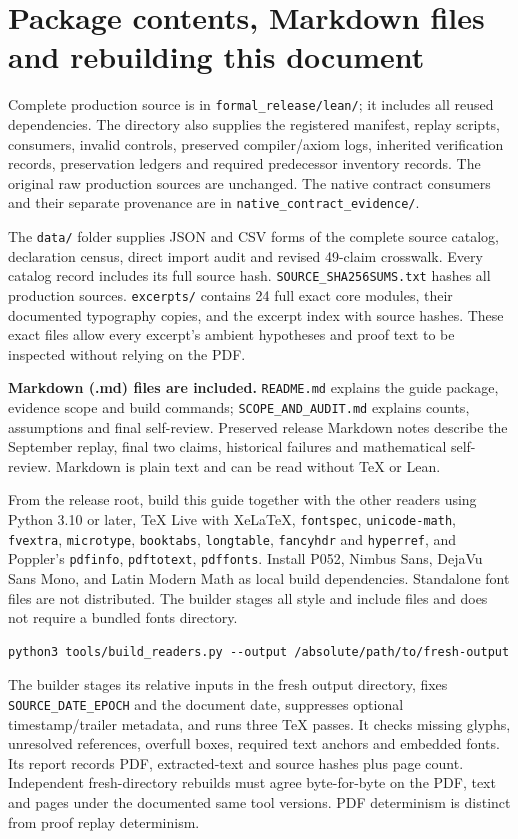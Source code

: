 \documentclass[11pt]{article}
\newcommand{\code}[1]{\nolinkurl{#1}}
\begin{document}
\section{Package contents, Markdown files and rebuilding this document}
Complete production source is in \code{formal_release/lean/}; it includes all reused dependencies. The directory also supplies the registered manifest, replay scripts, consumers, invalid controls, preserved compiler/axiom logs, inherited verification records, preservation ledgers and required predecessor inventory records. The original raw production sources are unchanged. The native contract consumers and their separate provenance are in \code{native_contract_evidence/}.

The \code{data/} folder supplies JSON and CSV forms of the complete source catalog, declaration census, direct import audit and revised 49-claim crosswalk. Every catalog record includes its full source hash. \code{SOURCE_SHA256SUMS.txt} hashes all production sources. \code{excerpts/} contains 24 full exact core modules, their documented typography copies, and the excerpt index with source hashes. These exact files allow every excerpt's ambient hypotheses and proof text to be inspected without relying on the PDF.

\textbf{Markdown (.md) files are included.} \code{README.md} explains the guide package, evidence scope and build commands; \code{SCOPE_AND_AUDIT.md} explains counts, assumptions and final self-review. Preserved release Markdown notes describe the September replay, final two claims, historical failures and mathematical self-review. Markdown is plain text and can be read without TeX or Lean.

From the release root, build this guide together with the other readers using Python 3.10 or later, TeX Live with XeLaTeX, \code{fontspec}, \code{unicode-math}, \code{fvextra}, \code{microtype}, \code{booktabs}, \code{longtable}, \code{fancyhdr} and \code{hyperref}, and Poppler's \code{pdfinfo}, \code{pdftotext}, \code{pdffonts}. Install P052, Nimbus Sans, DejaVu Sans Mono, and Latin Modern Math as local build dependencies. Standalone font files are not distributed. The builder stages all style and include files and does not require a bundled fonts directory.
\begin{Verbatim}[fontsize=\small,frame=lines]
python3 tools/build_readers.py --output /absolute/path/to/fresh-output
\end{Verbatim}
The builder stages its relative inputs in the fresh output directory, fixes \code{SOURCE_DATE_EPOCH} and the document date, suppresses optional timestamp/trailer metadata, and runs three TeX passes. It checks missing glyphs, unresolved references, overfull boxes, required text anchors and embedded fonts. Its report records PDF, extracted-text and source hashes plus page count. Independent fresh-directory rebuilds must agree byte-for-byte on the PDF, text and pages under the documented same tool versions. PDF determinism is distinct from proof replay determinism.
\end{document}
